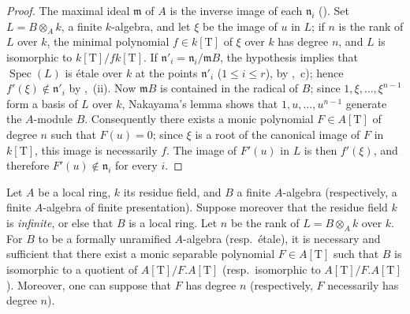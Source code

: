 \begin{proof}
The maximal ideal $\mathfrak{m}$ of $A$ is the inverse image of each $\mathfrak{n}_i$ ().
Set $L=B\otimes_A k$, a finite $k$-algebra, and let $\xi$ be the image of $u$ in $L$; if $n$ is the rank of $L$ over $k$, the minimal polynomial $f\in k[\mathrm{T}]$ of $\xi$ over $k$ has degree $n$, and $L$ is isomorphic to $k[\mathrm{T}]/f k[\mathrm{T}]$.
If $\mathfrak{n}'_i=\mathfrak{n}_i/\mathfrak{m}B$, the hypothesis implies that $\operatorname{Spec}(L)$ is \'etale over $k$ at the points $\mathfrak{n}'_i$ ($1\leq i\leq r$), by ,~c); hence $f'(\xi)\notin\mathfrak{n}'_i$ by ,~(ii).
Now $\mathfrak{m}B$ is contained in the radical of $B$; since $1,\xi,\ldots,\xi^{n-1}$ form a basis of $L$ over $k$, Nakayama's lemma shows that $1,u,\ldots,u^{n-1}$ generate the $A$-module $B$.
Consequently there exists a monic polynomial $F\in A[\mathrm{T}]$ of degree $n$ such that $F(u)=0$; since $\xi$ is a root of the canonical image of $F$ in $k[\mathrm{T}]$, this image is necessarily $f$.
The image of $F'(u)$ in $L$ is then $f'(\xi)$, and therefore $F'(u)\notin\mathfrak{n}_i$ for every $i$.
\end{proof}

\begin{proposition}[18.4.5]
\label{IV.18.4.5}
Let $A$ be a local ring, $k$ its residue field, and $B$ a finite $A$-algebra (respectively, a finite $A$-algebra of finite presentation).
Suppose moreover that the residue field $k$ is \emph{infinite}, or else that $B$ is a local ring.
Let $n$ be the rank of $L=B\otimes_A k$ over $k$.
For $B$ to be a formally unramified $A$-algebra (resp.\ \'etale), it is necessary and sufficient that there exist a monic separable polynomial $F\in A[\mathrm{T}]$ such that $B$ is isomorphic to a quotient of $A[\mathrm{T}]/F.A[\mathrm{T}]$ (resp.\ isomorphic to $A[\mathrm{T}]/F.A[\mathrm{T}]$).
Moreover, one can suppose that $F$ has degree $n$ (respectively, $F$ necessarily has degree $n$).
\end{proposition}


